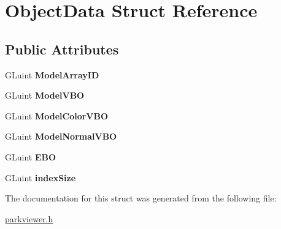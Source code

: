 \hypertarget{structObjectData}{}\section{Object\+Data Struct Reference}
\label{structObjectData}
\subsection*{Public Attributes}
\begin{DoxyCompactItemize}
\item 
G\+Luint {\bfseries Model\+Array\+ID}\hypertarget{structObjectData_a5c3bf29092ea1f7b5b411fde3c5d5bad}{}\label{structObjectData_a5c3bf29092ea1f7b5b411fde3c5d5bad}

\item 
G\+Luint {\bfseries Model\+V\+BO}\hypertarget{structObjectData_a69ac1c6cd824437ca3ec6de6e109d9dc}{}\label{structObjectData_a69ac1c6cd824437ca3ec6de6e109d9dc}

\item 
G\+Luint {\bfseries Model\+Color\+V\+BO}\hypertarget{structObjectData_a32729b92847ce95844008aa59036cfed}{}\label{structObjectData_a32729b92847ce95844008aa59036cfed}

\item 
G\+Luint {\bfseries Model\+Normal\+V\+BO}\hypertarget{structObjectData_a07945122d1dc787f964f7bc33d9ac7f1}{}\label{structObjectData_a07945122d1dc787f964f7bc33d9ac7f1}

\item 
G\+Luint {\bfseries E\+BO}\hypertarget{structObjectData_a447c28eae803e66fef8eef55fcc0aa09}{}\label{structObjectData_a447c28eae803e66fef8eef55fcc0aa09}

\item 
G\+Luint {\bfseries index\+Size}\hypertarget{structObjectData_a8c462f87d502431bf725fe784e14606b}{}\label{structObjectData_a8c462f87d502431bf725fe784e14606b}

\end{DoxyCompactItemize}


The documentation for this struct was generated from the following file\+:\begin{DoxyCompactItemize}
\item 
\hyperlink{parkviewer_8h}{parkviewer.\+h}\end{DoxyCompactItemize}
